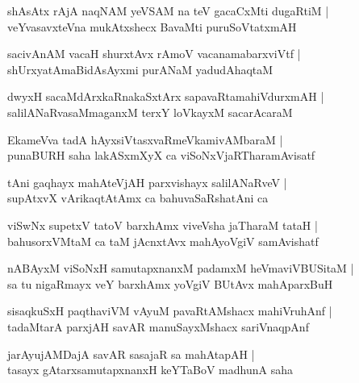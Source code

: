 \begin{shloka}
shAsAtx rAjA naqNAM yeVSAM na teV gacaCxMti dugaRtiM |\\
veYvasavxteVna mukAtxshecx BavaMti puruSoVtatxmAH 
\end{shloka}

\begin{shloka}
sacivAnAM vacaH shurxtAvx rAmoV vacanamabarxviVtf |\\
shUrxyatAmaBidAsAyxmi purANaM yadudAhaqtaM 
\end{shloka}

\begin{shloka}
dwyxH sacaMdArxkaRnakaSxtArx sapavaRtamahiVdurxmAH |\\
salilANaRvasaMmaganxM terxY loVkayxM sacarAcaraM 
\end{shloka}

\begin{shloka}
EkameVva tadA hAyxsiVtasxvaRmeVkamivAMbaraM |\\
punaBURH saha lakASxmXyX ca viSoNxVjaRTharamAvisatf 
\end{shloka}

\begin{shloka}
tAni gaqhayx mahAteVjAH parxvishayx salilANaRveV |\\
supAtxvX vArikaqtAtAmx ca bahuvaSaRshatAni ca 
\end{shloka}

\begin{shloka}
viSwNx supetxV tatoV barxhAmx viveVsha jaTharaM tataH |\\
bahusorxVMtaM ca taM jAcnxtAvx mahAyoVgiV samAvishatf 
\end{shloka}

\begin{shloka}
nABAyxM viSoNxH samutapxnanxM padamxM heVmaviVBUSitaM |\\
sa tu nigaRmayx veY barxhAmx yoVgiV BUtAvx mahAparxBuH 
\end{shloka}

\begin{shloka}
sisaqkuSxH paqthaviVM vAyuM pavaRtAMshacx mahiVruhAnf |\\
tadaMtarA parxjAH savAR\R{} manuSayxMshacx sariVnaqpAnf
\end{shloka}

\begin{shloka}
jarAyujAMDajA\R{} savAR\R{} sasajaR sa mahAtapAH |\\
tasayx gAtarxsamutapxnanxH keYTaBoV madhunA saha
\end{shloka}

